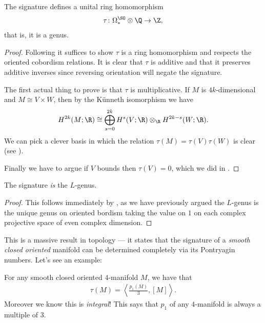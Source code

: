 \documentclass[11pt]{book}
\begin{document}
\begin{theorem}
\label{thm:signature-is-a-genus}
The signature defines a unital ring homomorphism
\begin{align*}
    \tau \colon \Omega^\SO_\ast \otimes \Q \to \Z,
\end{align*}
that is, it is a genus.
\end{theorem}
\begin{proof} Following \cite[8.2.1]{Hirzebruch} it suffices to show $\tau$ is a ring homomorphism and respects the oriented cobordism relations. It is clear that $\tau$ is additive and that it preserves additive inverses since reversing orientation will negate the signature.

The first actual thing to prove is that $\tau$ is multiplicative. If $M$ is $4k$-dimensional and $M \cong V \times W$, then by the K\"{u}nneth isomorphism we have
\begin{align*}
    H^{2k}(M;\R) \cong \bigoplus_{s=0}^{2k} H^{s}(V;\R) \otimes_\R H^{2k-s}(W;\R).
\end{align*}
We can pick a clever basis in which the relation $\tau(M) = \tau(V)\tau(W)$ is clear (see \cite[p.~85]{Hirzebruch}).

Finally we have to argue if $V$ bounds then $\tau(V)=0$, which we did in .
\end{proof}


\begin{theorem} The signature \emph{is} the $L$-genus.
\end{theorem}
\begin{proof} This follows immediately by , as we have previously argued the $L$-genus is the unique genus on oriented bordism taking the value on $1$ on each complex projective space of even complex dimension.
\end{proof}

This is a massive result in topology --- it states that the signature of a \emph{smooth closed oriented} manifold can be determined completely via its Pontryagin numbers. Let's see an example:

\begin{example} For any smooth closed oriented $4$-manifold $M$, we have that
\begin{align*}
    \tau(M) = \left\langle \frac{p_1(M)}{3}, [M] \right\rangle.
\end{align*}
Moreover we know this is \emph{integral}! This says that $p_1$ of any $4$-manifold is always a multiple of $3$.
\end{example}
\end{document}
